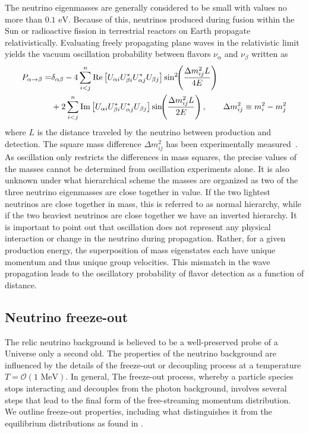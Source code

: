 \documentclass[universe,article,submit,moreauthors,pdftex,a4paper]{Definitions/mdpi}
\newcommand{\MeV}{\text{ MeV}}
\newcommand{\eV}{\text{ eV}}
\begin{document}
The neutrino eigenmasses are generally considered to be small with values no more than $0.1\eV$. Because of this, neutrinos produced during fusion within the Sun or radioactive fission in terrestrial reactors on Earth propagate relativistically. Evaluating freely propagating plane waves in the relativistic limit yields the vacuum oscillation probability between flavors $\nu_\alpha$ and $\nu_\beta$ written as~\cite{ParticleDataGroup:2022pth}
\begin{align}\label{NuOscillation}
  P_{\alpha\rightarrow\beta}
 =&\delta_{\alpha\beta}-4\sum_{i<j}^n \mathrm{Re}\left[U_{\alpha i}U^\ast_{\beta i}U^\ast_{\alpha j}U_{\beta j}\right]\sin^2\!\!\left(\frac{\Delta m^2_{ij}L}{4E}\right)\notag\\
 &+2\sum_{i<j}^n \mathrm{Im}\left[U_{\alpha i}U^\ast_{\beta i}U^\ast_{\alpha j}U_{\beta j}\right]\sin\!\!\left(\frac{\Delta m^2_{ij}L}{2E}\right)
 ,\qquad\Delta m^2_{ij}\equiv{m^2_i-m^2_j}
\end{align}
where $L$ is the distance traveled by the neutrino between production and detection. The square mass difference $\Delta m^2_{ij}$ has been experimentally measured~\cite{ParticleDataGroup:2022pth}. As oscillation only restricts the differences in mass squares, the precise values of the masses cannot be determined from oscillation experiments alone. It is also unknown under what hierarchical scheme the masses are organized as two of the three neutrino eigenmasses are close together in value. If the two lightest neutrinos are close together in mass, this is referred to as normal hierarchy, while if the two heaviest neutrinos are close together we have an inverted hierarchy. It is important to point out that oscillation does not represent any physical interaction or change in the neutrino during propagation. Rather, for a given production energy, the superposition of mass eigenstates each have unique momentum and thus unique group velocities. This mismatch in the wave propagation leads to the oscillatory probability of flavor detection as a function of distance.

\subsection{Neutrino freeze-out}\label{sec:Freezeout}
\noindent The relic neutrino background is believed to be a well-preserved probe of a Universe only a second old. The properties of the neutrino background are influenced by the details of the freeze-out or decoupling process at a temperature $T=\mathcal{O}(1\MeV)$. In general, The freeze-out process, whereby a particle species stops interacting and decouples from the photon background, involves several steps that lead to the final form of the free-streaming momentum distribution. We outline freeze-out properties, including what distinguishes it from the equilibrium distributions as found in \cite{Birrell:2012gg}.
\end{document}
